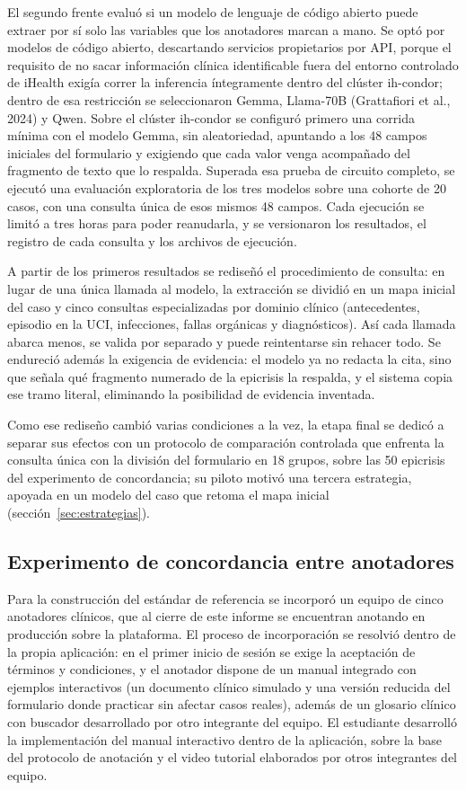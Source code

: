 \documentclass[12pt,letterpaper]{article}
\begin{document}
El segundo frente evaluó si un modelo de lenguaje de código abierto puede extraer por sí solo las variables que los anotadores marcan a mano. Se optó por modelos de código abierto, descartando servicios propietarios por API, porque el requisito de no sacar información clínica identificable fuera del entorno controlado de iHealth exigía correr la inferencia íntegramente dentro del clúster ih-condor; dentro de esa restricción se seleccionaron Gemma, Llama-70B (Grattafiori et al., 2024) y Qwen. Sobre el clúster ih-condor se configuró primero una corrida mínima con el modelo Gemma, sin aleatoriedad, apuntando a los 48 campos iniciales del formulario y exigiendo que cada valor venga acompañado del fragmento de texto que lo respalda. Superada esa prueba de circuito completo, se ejecutó una evaluación exploratoria de los tres modelos sobre una cohorte de 20 casos, con una consulta única de esos mismos 48 campos. Cada ejecución se limitó a tres horas para poder reanudarla, y se versionaron los resultados, el registro de cada consulta y los archivos de ejecución.

A partir de los primeros resultados se rediseñó el procedimiento de consulta: en lugar de una única llamada al modelo, la extracción se dividió en un mapa inicial del caso y cinco consultas especializadas por dominio clínico (antecedentes, episodio en la UCI, infecciones, fallas orgánicas y diagnósticos). Así cada llamada abarca menos, se valida por separado y puede reintentarse sin rehacer todo. Se endureció además la exigencia de evidencia: el modelo ya no redacta la cita, sino que señala qué fragmento numerado de la epicrisis la respalda, y el sistema copia ese tramo literal, eliminando la posibilidad de evidencia inventada.

Como ese rediseño cambió varias condiciones a la vez, la etapa final se dedicó a separar sus efectos con un protocolo de comparación controlada que enfrenta la consulta única con la división del formulario en 18 grupos, sobre las 50 epicrisis del experimento de concordancia; su piloto motivó una tercera estrategia, apoyada en un modelo del caso que retoma el mapa inicial (sección~\ref{sec:estrategias}).

\subsection{Experimento de concordancia entre anotadores}

Para la construcción del estándar de referencia se incorporó un equipo de cinco anotadores clínicos, que al cierre de este informe se encuentran anotando en producción sobre la plataforma. El proceso de incorporación se resolvió dentro de la propia aplicación: en el primer inicio de sesión se exige la aceptación de términos y condiciones, y el anotador dispone de un manual integrado con ejemplos interactivos (un documento clínico simulado y una versión reducida del formulario donde practicar sin afectar casos reales), además de un glosario clínico con buscador desarrollado por otro integrante del equipo. El estudiante desarrolló la implementación del manual interactivo dentro de la aplicación, sobre la base del protocolo de anotación y el video tutorial elaborados por otros integrantes del equipo.
\end{document}
